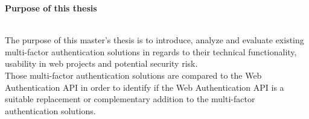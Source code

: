 \thispagestyle{empty}

{}

\begin{large}
	\textbf{Purpose of this thesis} \\ \\
\end{large}
The purpose of this master's thesis is to introduce, analyze and evaluate existing multi-factor authentication solutions in regards to their technical functionality, usability in web projects and potential security risk.\\
Those multi-factor authentication solutions are compared to the Web Authentication API in order to identify if the Web Authentication API is a suitable replacement or complementary addition to the multi-factor authentication solutions.
\newpage

